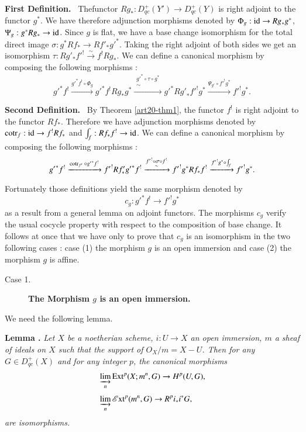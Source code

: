\medskip
\noindent
{\bf First Definition.}~ The\pageoriginale functor $Rg_{*}:D^{+}_{qc}(Y')\to D^{+}_{qc}(Y)$ is right adjoint to the functor $g^{*}$. We have therefore adjunction morphisms denoted by $\Phi_{g}:\operatorname{\mathrm{id}}\to Rg_{*}g^{*}$, $\Psi_{g}:g^{*}Rg_{*}\to \operatorname{\mathrm{id}}$. Since $g$ is flat, we have a base change isomorphism for the total direct image $\sigma : g^{*}Rf_{*}\to Rf'_{*}{g'}^{*}$. Taking the right adjoint of both sides we get an isomorphism $\tau : Rg'_{*}{f'}^{!}\xrightarrow{\sim}f^{!}Rg_{*}$. We can define a canonical morphism by composing the following morphisms :
$$
{g'}^{*}f^{!}\xrightarrow{{g'}^{*}f^{!}\circ \Phi_{g}}{g'}^{*}f^{!}Rg_{*}g^{*}\xrightarrow{\substack{{g'}^{*}\circ \tau\circ g^{*}\\ \sim}} {g'}^{*}R{g'}_{*}{f'}^{!}g^{*}\xrightarrow{\Psi_{g'}\circ {f'}^{!}g^{*}}{f'}^{!}g^{*}.
$$

\noindent
{\bf Second Definition.}~ By Theorem \ref{art20-thm1}, the functor $f^{!}$ is right adjoint to the functor $Rf_{*}$. Therefore we have adjunction morphisms denoted by $\operatorname{\mathrm{cotr}}_{f}:\operatorname{\mathrm{id}}\to f^{!}Rf_{*}$ and $\int_{f}:Rf_{*}f^{!}\to \operatorname{\mathrm{id}}$. We can define a canonical morphism by composing the following morphisms :
$$
{g'}^{*}f^{!}\xrightarrow{\operatorname{\mathrm{cotr}}_{f'}\circ {g'}^{*}f^{!}}{f'}^{!}Rf'_{*}{g'}^{*}f^{!}\xrightarrow{\substack{{f'}^{!}\circ \sigma \circ f^{!}\\ \sim}} {f'}^{!}g^{*}Rf_{*}f^{!}
\xrightarrow{{f'}^{!}g^{*}\circ \int_{f}}{f'}^{!}g^{*}.
$$

Fortunately those definitions yield the same morphism denoted by
$$
c_{g}:{g'}^{*}f^{!}\to {f'}^{!}g^{*}
$$
as a result from a general lemma on adjoint functors. The morphisms $c_{g}$ verify the usual cocycle property with respect to the composition of base change. It follows at once that we have only to prove that $c_{g}$ is an isomorphism in the two following cases : case (1) the morphism $g$ is an open immersion and case (2) the morphism $g$ is affine.
\begin{description}
\item[Case 1.] {\bf The Morphism \boldmath$g$ is an open immersion.}
\end{description}

We need the following lemma.

\medskip
\noindent
{\bf Lemma .\label{art20-sec2-lem2}}
{\em Let $X$ be a noetherian scheme, $i:U\to X$ an open immersion, $m$ a sheaf of ideals on $X$ such that the support of $O_{X}/m=X-U$. Then for any $G\in D^{+}_{qc}(X)$ and for any integer $p$, the canonical morphisms}
\begin{align*}
& \varinjlim_{n} \operatorname{\mathrm{Ext}}^{p}(X;m^{n},G)\to H^{p}(U,G),\\[3pt]
& \varinjlim_{n}\operatorname{\mathscr{E}\mathrm{xt}}^{p}(m^{n},G)\to R^{p}i_{*}i^{*}G,
\end{align*}\pageoriginale
{\em are isomorphisms.}


